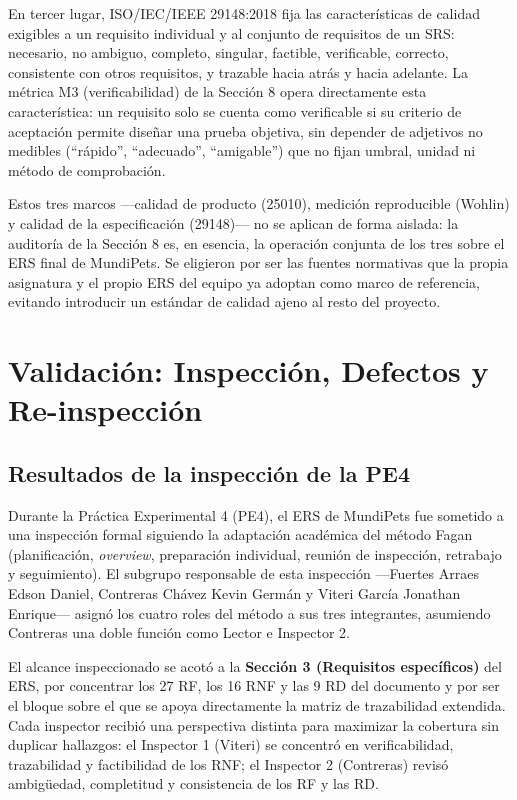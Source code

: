 \documentclass[11pt]{article}
\begin{document}
	En tercer lugar, ISO/IEC/IEEE 29148:2018 \cite{ieee29148} fija las características de calidad exigibles a un requisito individual y al conjunto de requisitos de un SRS: necesario, no ambiguo, completo, singular, factible, verificable, correcto, consistente con otros requisitos, y trazable hacia atrás y hacia adelante. La métrica M3 (verificabilidad) de la Sección 8 opera directamente esta característica: un requisito solo se cuenta como verificable si su criterio de aceptación permite diseñar una prueba objetiva, sin depender de adjetivos no medibles (``rápido'', ``adecuado'', ``amigable'') que no fijan umbral, unidad ni método de comprobación.
	
	Estos tres marcos ---calidad de producto (25010), medición reproducible (Wohlin) y calidad de la especificación (29148)--- no se aplican de forma aislada: la auditoría de la Sección 8 es, en esencia, la operación conjunta de los tres sobre el ERS final de MundiPets. Se eligieron por ser las fuentes normativas que la propia asignatura y el propio ERS del equipo ya adoptan como marco de referencia, evitando introducir un estándar de calidad ajeno al resto del proyecto.
	
	\newpage
	
	\section{Validación: Inspección, Defectos y Re-inspección}
	
	\subsection{Resultados de la inspección de la PE4}
	
	Durante la Práctica Experimental 4 (PE4), el ERS de MundiPets fue sometido a una inspección formal siguiendo la adaptación académica del método Fagan (planificación, \emph{overview}, preparación individual, reunión de inspección, retrabajo y seguimiento). El subgrupo responsable de esta inspección ---Fuertes Arraes Edson Daniel, Contreras Chávez Kevin Germán y Viteri García Jonathan Enrique--- asignó los cuatro roles del método a sus tres integrantes, asumiendo Contreras una doble función como Lector e Inspector 2.
	
	El alcance inspeccionado se acotó a la \textbf{Sección 3 (Requisitos específicos)} del ERS, por concentrar los 27 RF, los 16 RNF y las 9 RD del documento y por ser el bloque sobre el que se apoya directamente la matriz de trazabilidad extendida. Cada inspector recibió una perspectiva distinta para maximizar la cobertura sin duplicar hallazgos: el Inspector 1 (Viteri) se concentró en verificabilidad, trazabilidad y factibilidad de los RNF; el Inspector 2 (Contreras) revisó ambigüedad, completitud y consistencia de los RF y las RD.
	
\end{document}
